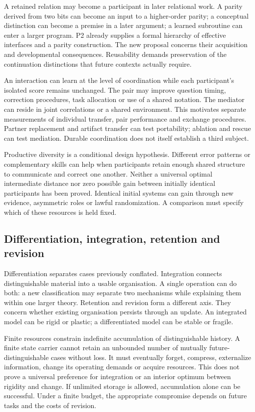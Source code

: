 \documentclass[
  11pt,
  a4paper,
]{article}
\begin{document}
A retained relation may become a participant in later relational work. A
parity derived from two bits can become an input to a higher-order
parity; a conceptual distinction can become a premise in a later
argument; a learned subroutine can enter a larger program. P2 already
supplies a formal hierarchy of effective interfaces and a parity
construction. The new proposal concerns their acquisition and
developmental consequences. Reusability demands preservation of the
continuation distinctions that future contexts actually require.

An interaction can learn at the level of coordination while each
participant's isolated score remains unchanged. The pair may improve
question timing, correction procedures, task allocation or use of a
shared notation. The mediator can reside in joint correlations or a
shared environment. This motivates separate measurements of individual
transfer, pair performance and exchange procedures. Partner replacement
and artifact transfer can test portability; ablation and rescue can test
mediation. Durable coordination does not itself establish a third
subject.

Productive diversity is a conditional design hypothesis. Different error
patterns or complementary skills can help when participants retain
enough shared structure to communicate and correct one another. Neither
a universal optimal intermediate distance nor zero possible gain between
initially identical participants has been proved. Identical initial
systems can gain through new evidence, asymmetric roles or lawful
randomization. A comparison must specify which of these resources is
held fixed.

\subsection{Differentiation, integration, retention and
revision}\label{differentiation-integration-retention-and-revision}

Differentiation separates cases previously conflated. Integration
connects distinguishable material into a usable organisation. A single
operation can do both: a new classification may separate two mechanisms
while explaining them within one larger theory. Retention and revision
form a different axis. They concern whether existing organisation
persists through an update. An integrated model can be rigid or plastic;
a differentiated model can be stable or fragile.

Finite resources constrain indefinite accumulation of distinguishable
history. A finite state carrier cannot retain an unbounded number of
mutually future-distinguishable cases without loss. It must eventually
forget, compress, externalize information, change its operating demands
or acquire resources. This does not prove a universal preference for
integration or an interior optimum between rigidity and change. If
unlimited storage is allowed, accumulation alone can be successful.
Under a finite budget, the appropriate compromise depends on future
tasks and the costs of revision.
\end{document}
